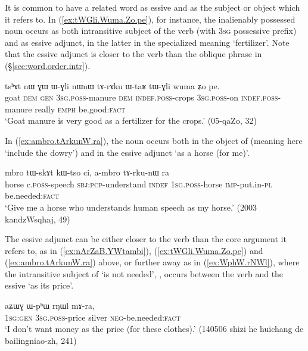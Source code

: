  
It is common to have a related word as essive and as the subject or object which it refers to. In (\ref{ex:tWGli.Wuma.Zo.pe}), for instance, the inalienably possessed noun  occurs as both intransitive subject of the verb  (with \textsc{3sg} possessive prefix) and as essive adjunct, in the latter in the specialized meaning `fertilizer'. Note that the essive adjunct is closer to the verb than the oblique phrase in  (§\ref{sec:word.order.intr}).

\begin{exe}
\ex \label{ex:tWGli.Wuma.Zo.pe}
\gll tsʰɤt nɯ ɣɯ ɯ-ɣli nɯnɯ tɤ-rɤku ɯ-taʁ tɯ-ɣli wuma ʑo pe. \\
goat \textsc{dem} \textsc{gen} \textsc{3sg}.\textsc{poss}-manure \textsc{dem} \textsc{indef}.\textsc{poss}-crops \textsc{3sg}.\textsc{poss}-on \textsc{indef}.\textsc{poss}-manure really \textsc{emph} be.good:\textsc{fact} \\
\glt `Goat manure is very good as a fertilizer for the crops.' (05-qaZo, 32)
\end{exe}

 In (\ref{ex:ambro.tArkunW.ra}), the noun  occurs both in the object of  (meaning here `include the dowry') and in the essive adjunct   `as a horse (for me)'.

\begin{exe}
\ex \label{ex:ambro.tArkunW.ra}
\gll mbro tɯ-skɤt kɯ-tso ci, a-mbro tɤ-rku-nɯ ra \\
horse c.\textsc{poss}-speech \textsc{sbj}:\textsc{pcp}-understand \textsc{indef} \textsc{1sg}.\textsc{poss}-horse \textsc{imp}-put.in-\textsc{pl} be.needed:\textsc{fact} \\
\glt `Give me a horse who understands human speech as my horse.'  (2003 kandzWsqhaj, 49)
\end{exe}

The essive adjunct can be either closer to the verb than the core argument it refers to, as in (\ref{ex:nArZaB.YWtambi}), (\ref{ex:tWGli.Wuma.Zo.pe}) and (\ref{ex:ambro.tArkunW.ra}) above, or further away as in (\ref{ex:WphW.rNWl}), where the intransitive  subject of  `is not needed', , occurs between the verb and the essive  `as its price'.

\begin{exe}
\ex \label{ex:WphW.rNWl}
\gll  aʑɯɣ ɯ-pʰɯ rŋɯl mɤ-ra, \\
\textsc{1sg}:\textsc{gen} \textsc{3sg}.\textsc{poss}-price silver \textsc{neg}-be.needed:\textsc{fact} \\
\glt `I don't want money as the price (for these clothes).' (140506 shizi he huichang de bailingniao-zh, 241)
\end{exe}

